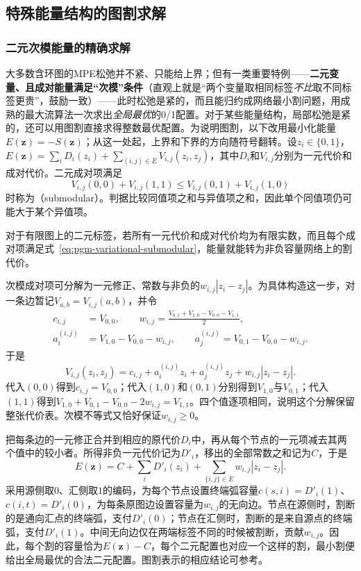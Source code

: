 \subsection{特殊能量结构的图割求解}

\subsubsection{二元次模能量的精确求解}

\label{sec:pgm-variational-graph-cut-special}
\label{sec:pgm-variational-graph-cuts}

大多数含环图的MPE松弛并不紧、只能给上界；但有一类重要特例——\textbf{二元变量、且成对能量满足“次模”条件}（直观上就是“两个变量取相同标签\emph{不比}取不同标签更贵”，鼓励一致）——此时松弛是紧的，而且能归约成网络最小割问题，用成熟的最大流算法一次求出\emph{全局最优}的0/1配置。对于某些能量结构，局部松弛是紧的，还可以用图割直接求得整数最优配置。为说明图割，以下改用最小化能量$E(\bm z)=-S(\bm z)$；从这一处起，上界和下界的方向随符号翻转。设$z_i\in\{0,1\}$，$E(\bm z)=\sum_iD_i(z_i)+\sum_{(i,j)\in E}V_{i,j}(z_i,z_j)$，其中$D_i$和$V_{i,j}$分别为一元代价和成对代价。二元成对项满足
\begin{equation}
  V_{i,j}(0,0)+V_{i,j}(1,1)
    \leq V_{i,j}(0,1)+V_{i,j}(1,0)
  \label{eq:pgm-variational-submodular}
\end{equation}
时称为（submodular）。判据比较同值项之和与异值项之和，因此单个同值项仍可能大于某个异值项。

对于有限图上的二元标签，若所有一元代价和成对代价均为有限实数，而且每个成对项满足式~\eqref{eq:pgm-variational-submodular}，能量就能转为非负容量网络上的割代价。

次模成对项可分解为一元修正、常数与非负的$w_{i,j}|z_i-z_j|$。为具体构造这一步，对一条边暂记$V_{a,b}=V_{i,j}(a,b)$，并令
\[
  \begin{aligned}
    c_{i,j}&=V_{0,0},\qquad
    w_{i,j}=\frac{V_{0,1}+V_{1,0}-V_{0,0}-V_{1,1}}2,\\
    a_i^{(i,j)}&=V_{1,0}-V_{0,0}-w_{i,j},\qquad
    a_j^{(i,j)}=V_{0,1}-V_{0,0}-w_{i,j}.
  \end{aligned}
\]
于是
\[
  V_{i,j}(z_i,z_j)
    =c_{i,j}+a_i^{(i,j)}z_i+a_j^{(i,j)}z_j
            +w_{i,j}|z_i-z_j|.
\]
代入$(0,0)$得到$c_{i,j}=V_{0,0}$；代入$(1,0)$和$(0,1)$分别得到$V_{1,0}$与$V_{0,1}$；代入$(1,1)$得到$V_{1,0}+V_{0,1}-V_{0,0}-2w_{i,j}=V_{1,1}$。四个值逐项相同，说明这个分解保留整张代价表。次模不等式又恰好保证$w_{i,j}\geq0$。

把每条边的一元修正合并到相应的原代价$D_i$中，再从每个节点的一元项减去其两个值中的较小者。所得非负一元代价记为$D'_i$，移出的全部常数之和记为$C$，于是
\[
  E(\bm z)=C+\sum_iD'_i(z_i)
    +\sum_{\{i,j\}\in E}w_{i,j}|z_i-z_j|.
\]
采用源侧取$0$、汇侧取$1$的编码，为每个节点设置终端弧容量$c(s,i)=D'_i(1)$、$c(i,t)=D'_i(0)$，为每条原图边设置容量为$w_{i,j}$的无向边。节点在源侧时，割断的是通向汇点的终端弧，支付$D'_i(0)$；节点在汇侧时，割断的是来自源点的终端弧，支付$D'_i(1)$。中间无向边仅在两端标签不同的时候被割断，贡献$w_{i,j}$。因此，每个割的容量恰为$E(\bm z)-C$，每个二元配置也对应一个这样的割，最小割便给出全局最优的合法二元配置。图割表示的相应结论可参考。

